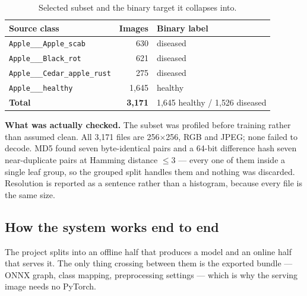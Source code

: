 \documentclass[10pt,a4paper]{article}
\begin{document}
\begin{table}[H]
\centering\small
\caption{Selected subset and the binary target it collapses into.}
\begin{tabular}{lrl}
\toprule
\textbf{Source class} & \textbf{Images} & \textbf{Binary label} \\
\midrule
\texttt{Apple\_\_\_Apple\_scab}        & 630   & diseased \\
\texttt{Apple\_\_\_Black\_rot}         & 621   & diseased \\
\texttt{Apple\_\_\_Cedar\_apple\_rust} & 275   & diseased \\
\texttt{Apple\_\_\_healthy}            & 1{,}645 & healthy \\
\midrule
\textbf{Total} & \textbf{3{,}171} & 1{,}645 healthy / 1{,}526 diseased \\
\bottomrule
\end{tabular}
\end{table}

\textbf{What was actually checked.} The subset was profiled before training rather than
assumed clean. All 3{,}171 files are 256$\times$256, RGB and JPEG; none failed to decode.
MD5 found seven byte-identical pairs and a 64-bit difference hash seven near-duplicate
pairs at Hamming distance $\leq 3$ --- every one of them inside a single leaf group, so
the grouped split handles them and nothing was discarded. Resolution is reported as a
sentence rather than a histogram, because every file is the same size.

\subsection*{How the system works end to end}

The project splits into an offline half that produces a model and an online half that
serves it. The only thing crossing between them is the exported bundle --- ONNX graph,
class mapping, preprocessing settings --- which is why the serving image needs no PyTorch.
\end{document}
